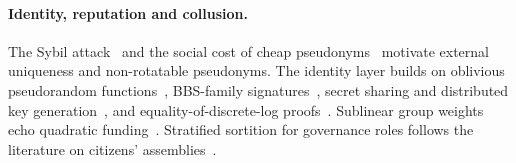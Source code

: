 \paragraph{Identity, reputation and collusion.} The Sybil attack~\cite{douceur2002sybil} and the
social cost of cheap pseudonyms~\cite{friedman2001pseudonyms} motivate external uniqueness and
non-rotatable pseudonyms. The identity layer builds on oblivious pseudorandom
functions~\cite{rfc9497,jarecki2017toppss}, BBS-family
signatures~\cite{boneh2004short,camenisch2004signature,au2006bbsplus,tessaro2023bbs}, secret
sharing and distributed key generation~\cite{shamir1979,gennaro2007dkg}, and equality-of-discrete-log
proofs~\cite{chaum1992wallet}. Sublinear group weights echo quadratic
funding~\cite{buterin2019flexible}. Stratified sortition for governance roles follows the
literature on citizens' assemblies~\cite{flanigan2021sortition}.
